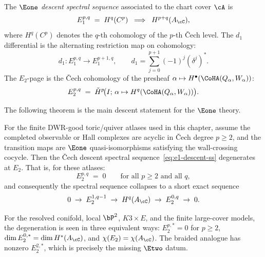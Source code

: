 \begin{definition}
\label{def:e1-descent-ss}
The \emph{$\Eone$ descent spectral sequence} associated to the chart cover $\cA$ is
\begin{equation}
\label{eq:e1-descent-ss}
 E_1^{p,q} \;=\; H^q(C^p) \;\;\Longrightarrow\;\; H^{p+q}(A_\cC),
\end{equation}
where $H^q(C^p)$ denotes the $q$-th cohomology of the $p$-th \v{C}ech level. The $d_1$ differential is the alternating restriction map on cohomology:
\[
 d_1 \colon E_1^{p,q} \to E_1^{p+1,q}, \qquad d_1 = \sum_{j=0}^{p+1} (-1)^j (\delta^j)^*.
\]
The $E_2$-page is the \v{C}ech cohomology of the presheaf $\alpha \mapsto H^\bullet(\CoHA(Q_\alpha, W_\alpha))$:
\begin{equation}
\label{eq:e2-page}
 E_2^{p,q} \;=\; \check{H}^p\!\bigl(I;\, \alpha \mapsto H^q(\CoHA(Q_\alpha, W_\alpha))\bigr).
\end{equation}
\end{definition}

The following theorem is the main descent statement for the $\Eone$ theory.

\begin{theorem}
\label{thm:e1-descent-degeneration}
For the finite DWR-good toric/quiver atlases used in this chapter, assume the completed observable or Hall complexes are acyclic in \v{C}ech degree $p\geq2$, and the transition maps are $\Eone$ quasi-isomorphisms satisfying the wall-crossing cocycle. Then the \v{C}ech descent spectral sequence~\eqref{eq:e1-descent-ss} degenerates at $E_2$. That is, for these atlases:
\begin{equation}
\label{eq:e1-degeneration}
 E_2^{p,q} \;=\; 0 \qquad \text{for all } p \geq 2 \text{ and all } q,
\end{equation}
and consequently the spectral sequence collapses to a short exact sequence
\[
 0 \;\to\; E_2^{1,q-1} \;\to\; H^q(A_\cC) \;\to\; E_2^{0,q} \;\to\; 0.
\]

For the resolved conifold, local $\bP^2$, $K3 \times E$, and the finite
large-cover models, the degeneration is seen in three equivalent ways:
\(E_2^{p,*}=0\) for \(p\geq2\), \(\dim E_2^{0,*}=\dim H^*(A_\cC)\), and
\(\chi(E_2)=\chi(A_\cC)\). The braided analogue has nonzero
\(E_2^{2,*}\), which is precisely the missing $\Etwo$ datum.
\end{theorem}


